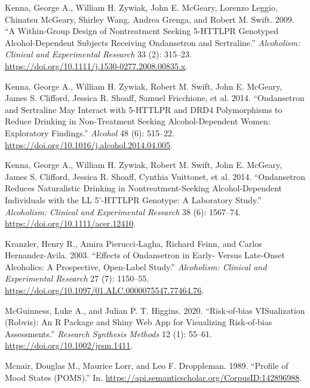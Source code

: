 \documentclass[
  12pt,
]{article}
\newlength{\cslhangindent}
\newenvironment{CSLReferences}[2] %
 {\begin{list}{}{%
  \setlength{\itemindent}{0pt}
  \setlength{\leftmargin}{0pt}
  \setlength{\parsep}{0pt}
  \ifodd #1
   \setlength{\leftmargin}{\cslhangindent}
   \setlength{\itemindent}{-1\cslhangindent}
  \fi
  \setlength{\itemsep}{#2\baselineskip}}}
 {\end{list}}
\begin{document}
\begin{CSLReferences}{1}{0}
Kenna, George A., William H. Zywiak, John E. McGeary, Lorenzo Leggio,
Chinatsu McGeary, Shirley Wang, Andrea Grenga, and Robert M. Swift.
2009. {``A {Within}‐{Group Design} of {Nontreatment Seeking} 5‐{HTTLPR
Genotyped Alcohol}‐{Dependent Subjects Receiving Ondansetron} and
{Sertraline}.''} \emph{Alcoholism: Clinical and Experimental Research}
33 (2): 315--23. \url{https://doi.org/10.1111/j.1530-0277.2008.00835.x}.

Kenna, George A., William H. Zywiak, Robert M. Swift, John E. McGeary,
James S. Clifford, Jessica R. Shoaff, Samuel Fricchione, et al. 2014.
{``Ondansetron and Sertraline May Interact with 5-{HTTLPR} and {DRD4}
Polymorphisms to Reduce Drinking in Non-Treatment Seeking
Alcohol-Dependent Women: {Exploratory} Findings.''} \emph{Alcohol} 48
(6): 515--22. \url{https://doi.org/10.1016/j.alcohol.2014.04.005}.

Kenna, George A., William H. Zywiak, Robert M. Swift, John E. McGeary,
James S. Clifford, Jessica R. Shoaff, Cynthia Vuittonet, et al. 2014.
{``Ondansetron {Reduces Naturalistic Drinking} in {Nontreatment-Seeking
Alcohol-Dependent Individuals} with the {LL} 5'-{HTTLPR Genotype}: {A
Laboratory Study}.''} \emph{Alcoholism: Clinical and Experimental
Research} 38 (6): 1567--74. \url{https://doi.org/10.1111/acer.12410}.

Kranzler, Henry R., Amira Pierucci‐Lagha, Richard Feinn, and Carlos
Hernandez‐Avila. 2003. {``Effects of {Ondansetron} in {Early}‐ {Versus
Late}‐{Onset Alcoholics}: {A Prospective}, {Open}‐{Label Study}.''}
\emph{Alcoholism: Clinical and Experimental Research} 27 (7): 1150--55.
\url{https://doi.org/10.1097/01.ALC.0000075547.77464.76}.

McGuinness, Luke A., and Julian P. T. Higgins. 2020. {``Risk‐of‐bias
{VISualization} (Robvis): {An R} Package and {Shiny} Web App for
Visualizing Risk‐of‐bias Assessments.''} \emph{Research Synthesis
Methods} 12 (1): 55--61. \url{https://doi.org/10.1002/jrsm.1411}.

Mcnair, Douglas M., Maurice Lorr, and Leo F. Droppleman. 1989.
{``Profile of Mood States ({POMS}).''} In.
\url{https://api.semanticscholar.org/CorpusID:142896988}.


\end{CSLReferences}
\end{document}
